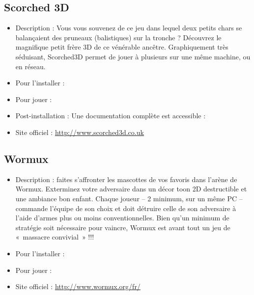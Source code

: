 \subsection{Scorched 3D}
\begin{itemize}
\begingroup
{}
\item Description : Vous vous souvenez de ce jeu dans lequel deux petits chars se balançaient des pruneaux (balistiques) sur la tronche ? Découvrez le magnifique petit frère 3D de ce vénérable ancêtre. Graphiquement très séduisant, Scorched3D permet de jouer à plusieurs sur une même machine, ou en réseau.{\par}
\endgroup
\item Pour l'installer : 
\item Pour jouer : 
\item Post-installation : Une documentation complète est accessible : 
\item Site officiel : \url{http://www.scorched3d.co.uk}{\par}
\end{itemize}
\subsection{Wormux}
\begin{itemize}
\begingroup
{}
\item Description : faites s'affronter les mascottes de vos  favoris dans l'arène de Wormux. Exterminez votre adversaire dans un décor toon 2D destructible et une ambiance bon enfant. Chaque joueur -- 2 minimum, sur un même PC -- commande l'équipe de son choix et doit détruire celle de son adversaire à l'aide d'armes plus ou moins conventionnelles. Bien qu'un minimum de stratégie soit nécessaire pour vaincre, Wormux est avant tout un jeu de «~massacre convivial~» !!!{\par}
\item Pour l'installer : 
\item Pour jouer : 
\item Site officiel : \url{http://www.wormux.org/fr/}{\par}
\endgroup
\end{itemize}
